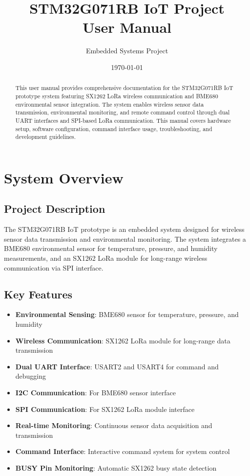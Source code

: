 \documentclass[11pt,a4paper]{article}
\title{\Huge\textbf{STM32G071RB IoT Project\\User Manual}}
\author{Embedded Systems Project}
\date{\today}
\begin{document}
\maketitle

\begin{abstract}
This user manual provides comprehensive documentation for the STM32G071RB IoT prototype system featuring SX1262 LoRa wireless communication and BME680 environmental sensor integration. The system enables wireless sensor data transmission, environmental monitoring, and remote command control through dual UART interfaces and SPI-based LoRa communication. This manual covers hardware setup, software configuration, command interface usage, troubleshooting, and development guidelines.
\end{abstract}

\tableofcontents
\newpage

\section{System Overview}

\subsection{Project Description}
The STM32G071RB IoT prototype is an embedded system designed for wireless sensor data transmission and environmental monitoring. The system integrates a BME680 environmental sensor for temperature, pressure, and humidity measurements, and an SX1262 LoRa module for long-range wireless communication via SPI interface.

\subsection{Key Features}
\begin{itemize}
    \item \textbf{Environmental Sensing}: BME680 sensor for temperature, pressure, and humidity
    \item \textbf{Wireless Communication}: SX1262 LoRa module for long-range data transmission
    \item \textbf{Dual UART Interface}: USART2 and USART4 for command and debugging
    \item \textbf{I2C Communication}: For BME680 sensor interface
    \item \textbf{SPI Communication}: For SX1262 LoRa module interface
    \item \textbf{Real-time Monitoring}: Continuous sensor data acquisition and transmission
    \item \textbf{Command Interface}: Interactive command system for system control
    \item \textbf{BUSY Pin Monitoring}: Automatic SX1262 busy state detection
\end{itemize}
\end{document}
